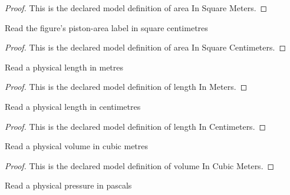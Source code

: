 \begin{proof}
  This is the declared model definition of area In Square Meters.
\end{proof}
\begin{definition}
  \label{def:physics:phyx-mini-0375:phyxminiproblems-problemphyxmini0375-areainsquarecentimeters}
  Read the figure's piston-area label in square centimetres
\end{definition}
\begin{proof}
  This is the declared model definition of area In Square Centimeters.
\end{proof}
\begin{definition}
  \label{def:physics:phyx-mini-0375:phyxminiproblems-problemphyxmini0375-lengthinmeters}
  Read a physical length in metres
\end{definition}
\begin{proof}
  This is the declared model definition of length In Meters.
\end{proof}
\begin{definition}
  \label{def:physics:phyx-mini-0375:phyxminiproblems-problemphyxmini0375-lengthincentimeters}
  Read a physical length in centimetres
\end{definition}
\begin{proof}
  This is the declared model definition of length In Centimeters.
\end{proof}
\begin{definition}
  \label{def:physics:phyx-mini-0375:phyxminiproblems-problemphyxmini0375-volumeincubicmeters}
  Read a physical volume in cubic metres
\end{definition}
\begin{proof}
  This is the declared model definition of volume In Cubic Meters.
\end{proof}
\begin{definition}
  \label{def:physics:phyx-mini-0375:phyxminiproblems-problemphyxmini0375-pressureinpascals}
  Read a physical pressure in pascals
\end{definition}
